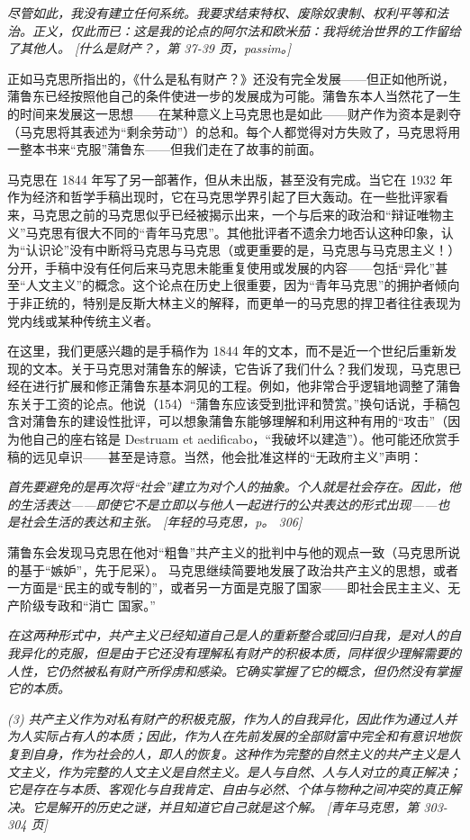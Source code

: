 \documentclass[DIV=12,%
               BCOR=0mm,%
               headinclude=false,%
               footinclude=false,open=any,%
               fontsize=10pt,%
               oneside,%
               paper=210mm:11in]%
               {scrbook}
\begin{document}
\emph{尽管如此，我没有建立任何系统。我要求结束特权、废除奴隶制、权利平等和法治。正义，仅此而已：这是我的论点的阿尔法和欧米茄：我将统治世界的工作留给了其他人。 [什么是财产？，第 37-39 页，passim。]}


正如马克思所指出的，《什么是私有财产？》还没有完全发展——但正如他所说，蒲鲁东已经按照他自己的条件使进一步的发展成为可能。蒲鲁东本人当然花了一生的时间来发展这一思想——在某种意义上马克思也是如此——财产作为资本是剥夺（马克思将其表述为“剩余劳动”）的总和。每个人都觉得对方失败了，马克思将用一整本书来“克服”蒲鲁东——但我们走在了故事的前面。


马克思在 1844 年写了另一部著作，但从未出版，甚至没有完成。当它在 1932 年作为经济和哲学手稿出现时，它在马克思学界引起了巨大轰动。在一些批评家看来，马克思之前的马克思似乎已经被揭示出来，一个与后来的政治和“辩证唯物主义”马克思有很大不同的“青年马克思”。其他批评者不遗余力地否认这种印象，认为“认识论”没有中断将马克思与马克思（或更重要的是，马克思与马克思主义！）分开，手稿中没有任何后来马克思未能重复使用或发展的内容——包括“异化”甚至“人文主义”的概念。这个论点在历史上很重要，因为“青年马克思”的拥护者倾向于非正统的，特别是反斯大林主义的解释，而更单一的马克思的捍卫者往往表现为党内线或某种传统主义者。


在这里，我们更感兴趣的是手稿作为 1844 年的文本，而不是近一个世纪后重新发现的文本。关于马克思对蒲鲁东的解读，它告诉了我们什么？我们发现，马克思已经在进行扩展和修正蒲鲁东基本洞见的工程。例如，他非常合乎逻辑地调整了蒲鲁东关于工资的论点。他说（154）“蒲鲁东应该受到批评和赞赏。”换句话说，手稿包含对蒲鲁东的建设性批评，可以想象蒲鲁东能够理解和利用这种有用的“攻击”（因为他自己的座右铭是 Destruam et aedificabo，“我破坏以建造”）。他可能还欣赏手稿的远见卓识——甚至是诗意。当然，他会批准这样的“无政府主义”声明：


\emph{首先要避免的是再次将“社会”建立为对个人的抽象。个人就是社会存在。因此，他的生活表达——即使它不是立即以与他人一起进行的公共表达的形式出现——也是社会生活的表达和主张。 [年轻的马克思，p。 306]}


蒲鲁东会发现马克思在他对“粗鲁”共产主义的批判中与他的观点一致（马克思所说的基于“嫉妒”，先于尼采）。 马克思继续简要地发展了政治共产主义的思想，或者一方面是“民主的或专制的”，或者另一方面是克服了国家——即社会民主主义、无产阶级专政和“消亡 国家。”


\emph{在这两种形式中，共产主义已经知道自己是人的重新整合或回归自我，是对人的自我异化的克服，但是由于它还没有理解私有财产的积极本质，​​同样很少理解需要的人性，它仍然被私有财产所俘虏和感染。它确实掌握了它的概念，但仍然没有掌握它的本质。}


\emph{(3) 共产主义作为对私有财产的积极克服，作为人的自我异化，因此作为通过人并为人实际占有人的本质；因此，作为人在先前发展的全部财富中完全和有意识地恢复到自身，作为社会的人，即人的恢复。这种作为完整的自然主义的共产主义是人文主义，作为完整的人文主义是自然主义。是人与自然、人与人对立的真正解决；它是存在与本质、客观化与自我肯定、自由与必然、个体与物种之间冲突的真正解决。它是解开的历史之谜，并且知道它自己就是这个解。 [青年马克思，第 303-304 页]}
\end{document}
